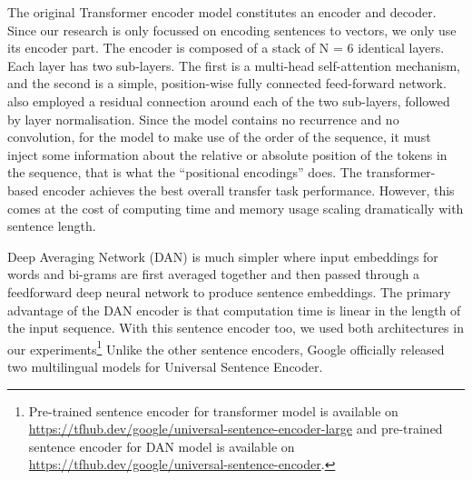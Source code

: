 The original Transformer encoder model constitutes an encoder and decoder. Since our research is only focussed on encoding sentences to vectors, we only use its encoder part. The encoder is composed of a stack of N = 6 identical layers. Each layer has two sub-layers. The first is a multi-head self-attention mechanism, and the second is a simple, position-wise fully connected feed-forward network. \citet{cer2018universal} also employed a residual connection around each of the two sub-layers,
followed by layer normalisation. Since the model contains no recurrence and no convolution, for the model to make use of the order of the sequence, it must inject some information about the relative or absolute position of the tokens in the sequence, that is what the “positional encodings” does. The transformer-based encoder achieves the best overall transfer task performance. However, this comes at the cost of computing time and memory usage scaling dramatically with sentence length.

Deep Averaging Network (DAN) is much simpler where input embeddings for words and bi-grams are first averaged together and then passed through a feedforward deep neural network to produce sentence embeddings. The primary advantage of the DAN encoder is that computation time is linear in the length of the input sequence. With this sentence encoder too, we used both architectures in our experiments\footnote{Pre-trained sentence encoder for transformer model is available on \url{https://tfhub.dev/google/universal-sentence-encoder-large} and pre-trained sentence encoder for DAN model is available on \url{https://tfhub.dev/google/universal-sentence-encoder}.} Unlike the other sentence encoders, Google officially released two multilingual models for Universal Sentence Encoder.

